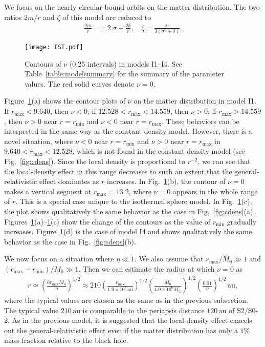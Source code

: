 \documentclass[aps,11pt,nofootinbib,preprintnumbers,groupedaddress,superscriptaddress]{revtex4-2}
\begin{document}
We focus on the nearly circular 
bound orbits on the matter distribution.
The two ratios $2m/r$ and $\zeta$ of this model are reduced to
\begin{align}
\frac{2m}{r}&=2\:\!\sigma+\frac{2\delta}{r},
\quad
\zeta=\frac{\sigma r}{3(\sigma r+\delta)}.
\end{align}
\begin{figure}[t]
\centering
\texttt{[image: IST.pdf]}
\caption{
Contours of $\nu$ (0.25 intervals) in models I1--I4. 
See Table~\ref{table:modelsummary} for the summary of the parameter values. 
The red solid curves denote $\nu=0$. 
}
\label{fig:iso}
\end{figure}
Figure~\ref{fig:iso}(a) 
shows the contour plots of $\nu$ on the matter distribution in model I1. 
If $r_{\mathrm{max}}<9.640$, then $\nu<0$;
if $12.528%
<r_{\mathrm{max}}<14.559$, 
then $\nu>0$; 
if $r_{\mathrm{max}}>14.559$, then $\nu>0$ near $r=r_{\mathrm{min}}$ and $\nu<0$ near $r=r_{\mathrm{max}}$. 
These behaviors can be interpreted in the same way as the constant density model. 
However, there is a novel 
situation, where
$\nu<0$ near $r=r_{\mathrm{min}}$ and $\nu>0$ near $r=r_{\mathrm{max}}$ in $9.640<r_{\mathrm{max}}<12.528$, 
which is not found in the constant density model (see Fig.~\ref{fig:cdens}).
Since the local density is proportional to $r^{-2}$, we can see that the 
local-density effect in this range decreases to such an extent that the 
general-relativistic effect dominates as $r$ increases. 
In Fig.~\ref{fig:iso}(b), 
the contour of $\nu=0$ makes a vertical segment at $r_{\mathrm{max}}=13.2$, 
where 
$\nu=0$ appears in the whole range of $r$. 
This is a special case unique to the isothermal sphere model.
In Fig.~\ref{fig:iso}(c), 
the plot shows qualitatively the same behavior as the case in Fig.~\ref{fig:cdens}(a). 
Figures~\ref{fig:iso}(a)--\ref{fig:iso}(c) 
show the change of the contours 
as the value of $r_{\mathrm{min}}$ gradually increases. 
Figure~\ref{fig:iso}(d) is the case of model I4 and shows
qualitatively the same behavior as the case in Fig.~\ref{fig:cdens}(b). 


We now focus on a situation where $\eta\ll 1$. 
We also assume that $r_{\mathrm{max}}/M_0\gg 1$ and $(r_{\mathrm{max}}-r_{\mathrm{min}})/M_0 \gg1$. 
Then we can estimate the radius at which $\nu=0$ as 
\begin{align}
r\simeq 
\left(\frac{6 r_{\mathrm{max}} M_0}{\eta}\right)^{1/2}
\approx 210 
\left(\frac{r_{\mathrm{max}}}{1.9\times 10^3 \,\mathrm{au}}\right)^{1/2} 
\left(\frac{M_0}{4.0\times 10^{6} M_{\odot}}\right)^{1/2}\left(\frac{0.01}{\eta}\right)^{1/2}
\,\mathrm{au},
\end{align}
where the typical values are chosen as the same as in the previous subsection. 
The typical value $210 \,\mathrm{au}$ is comparable to the periapsis distance $120 \,\mathrm{au}$ of S2/S0-2.
As in the previous model, it is suggested that the local-density effect cancels out the general-relativistic effect even if the matter distribution has only a $1\%$ mass fraction relative to the black hole.
\end{document}

